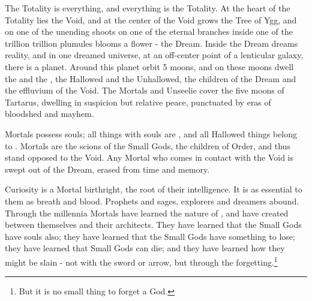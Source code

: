 


    The Totality is everything, and everything is the Totality. At the heart of the Totality lies the Void, and at the center of the Void grows the Tree of Ygg, and on one of the unending shoots on one of the eternal branches inside one of the trillion trillion plumules blooms a flower - the Dream. Inside the Dream \TheAuthority dreams reality, and in one dreamed universe, at an off-center point of a lenticular galaxy, there is a planet. Around this planet orbit 5 moons, and on these moons dwell the  and the , the Hallowed and the Unhallowed, the children of the Dream and the effluvium of the Void. The Mortals and Unseelie cover the five moons of Tartarus, dwelling in suspicion but relative peace, punctuated by eras of bloodshed and mayhem. 

   Mortals possess souls; all things with souls are , and all Hallowed things belong to . Mortals are the scions of the Small Gods, the children of Order, and thus stand opposed to the Void. Any Mortal who comes in contact with the Void is swept out of the Dream, erased from time and memory.

   Curiosity is a Mortal birthright, the root of their intelligence. It is as essential to them as breath and blood. Prophets and sages, explorers and dreamers abound. Through the millennia Mortals have learned the nature of , and have created  between themselves and their architects. They have learned that the Small Gods have souls also; they have learned that the Small Gods have something to lose; they have learned that Small Gods can die; and they have learned how they might be slain - not with the sword or arrow, but through the forgetting.\footnote{But it is no small thing to forget a God.}

